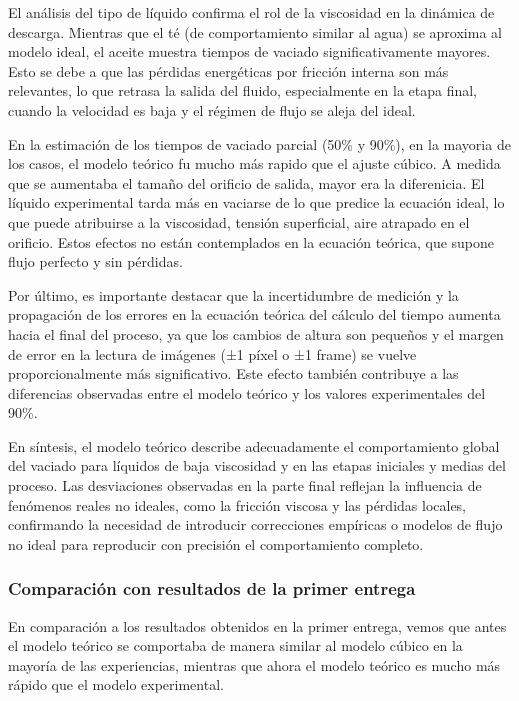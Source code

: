 \documentclass{article}
\begin{document}
El análisis del tipo de líquido confirma el rol de la viscosidad en la dinámica de descarga.
Mientras que el té (de comportamiento similar al agua) se aproxima al modelo ideal, el aceite muestra tiempos de vaciado significativamente mayores.
Esto se debe a que las pérdidas energéticas por fricción interna son más relevantes, lo que retrasa la salida del fluido, especialmente en la etapa final, cuando la velocidad es baja y el régimen de flujo se aleja del ideal.

En la estimación de los tiempos de vaciado parcial (50\% y 90\%), en la mayoria de los casos, el modelo teórico fu mucho más rapido que el ajuste cúbico. A medida que se aumentaba el tamaño del orificio de salida, mayor era la diferenicia. El líquido experimental tarda más en vaciarse de lo que predice la ecuación ideal, lo que puede atribuirse a la viscosidad, tensión superficial, aire atrapado en el orificio.
Estos efectos no están contemplados en la ecuación teórica, que supone flujo perfecto y sin pérdidas.

Por último, es importante destacar que la incertidumbre de medición y la propagación de los errores en la ecuación teórica del cálculo del tiempo aumenta hacia el final del proceso, ya que los cambios de altura son pequeños y el margen de error en la lectura de imágenes (±1 píxel o ±1 frame) se vuelve proporcionalmente más significativo.
Este efecto también contribuye a las diferencias observadas entre el modelo teórico y los valores experimentales del 90\%.

En síntesis, el modelo teórico describe adecuadamente el comportamiento global del vaciado para líquidos de baja viscosidad y en las etapas iniciales y medias del proceso.
Las desviaciones observadas en la parte final reflejan la influencia de fenómenos reales no ideales, como la fricción viscosa y las pérdidas locales, confirmando la necesidad de introducir correcciones empíricas o modelos de flujo no ideal para reproducir con precisión el comportamiento completo.

\subsubsection{Comparación con resultados de la primer entrega}

En comparación a los resultados obtenidos en la primer entrega, vemos que antes el modelo teórico se comportaba de manera similar al modelo cúbico en la mayoría de las experiencias, mientras que ahora el modelo teórico es mucho más rápido que el modelo experimental.
\end{document}
